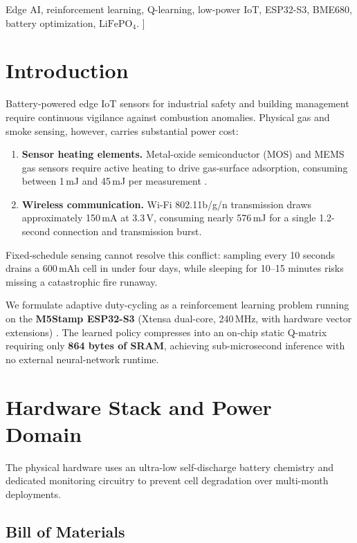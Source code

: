 \documentclass[10pt,twocolumn]{article}
\begin{document}
  \enspace
  Edge AI, reinforcement learning, Q-learning, low-power IoT, ESP32-S3, BME680, battery optimization, $\text{LiFePO}_4$.
  \vspace{14pt}
]

\section{Introduction}

Battery-powered edge IoT sensors for industrial safety and building management require continuous vigilance against combustion anomalies. Physical gas and smoke sensing, however, carries substantial power cost:

\begin{enumerate}[leftmargin=1.4em]
    \item \textbf{Sensor heating elements.} Metal-oxide semiconductor (MOS) and MEMS gas sensors require active heating to drive gas-surface adsorption, consuming between 1\,mJ and 45\,mJ per measurement \cite{b1}.
    \item \textbf{Wireless communication.} Wi-Fi 802.11b/g/n transmission draws approximately 150\,mA at 3.3\,V, consuming nearly 576\,mJ for a single 1.2-second connection and transmission burst.
\end{enumerate}

Fixed-schedule sensing cannot resolve this conflict: sampling every 10 seconds drains a 600\,mAh cell in under four days, while sleeping for 10--15 minutes risks missing a catastrophic fire runaway.

We formulate adaptive duty-cycling as a reinforcement learning problem running on the \textbf{M5Stamp ESP32-S3} (Xtensa dual-core, 240\,MHz, with hardware vector extensions) \cite{b3}. The learned policy compresses into an on-chip static Q-matrix requiring only \textbf{864 bytes of SRAM}, achieving sub-microsecond inference with no external neural-network runtime.

\section{Hardware Stack and Power Domain}

The physical hardware uses an ultra-low self-discharge battery chemistry and dedicated monitoring circuitry to prevent cell degradation over multi-month deployments.

\subsection{Bill of Materials}
\end{document}
